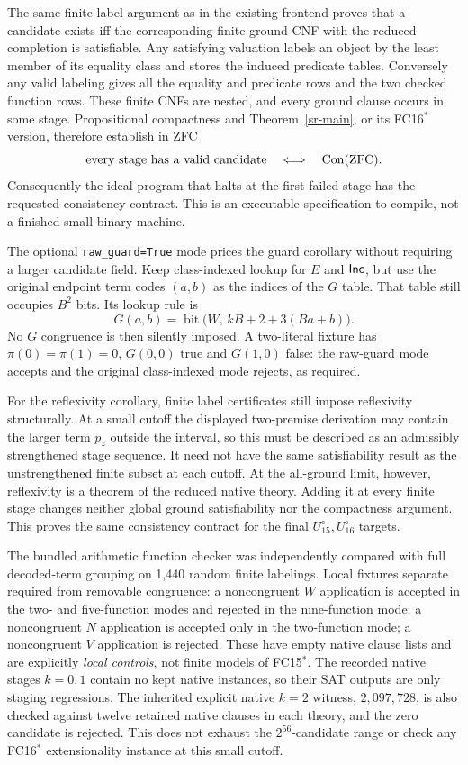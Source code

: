 The same finite-label argument as in the existing frontend proves that a
candidate exists iff the corresponding finite ground CNF with the reduced
completion is satisfiable. Any satisfying valuation labels an object by
the least member of its equality class and stores the induced predicate
tables. Conversely any valid labeling gives all the equality and predicate
rows and the two checked function rows. These finite CNFs are nested, and
every ground clause occurs in some stage. Propositional compactness and
Theorem~\ref{sr-main}, or its FC16$^*$ version, therefore establish in ZFC
\[
\text{every stage has a valid candidate}
\quad\Longleftrightarrow\quad\operatorname{Con}(\mathrm{ZFC}).
\]
Consequently the ideal program that halts at the first failed stage has
the requested consistency contract. This is an executable specification
to compile, not a finished small binary machine.

The optional \texttt{raw\_guard=True} mode prices the guard corollary
without requiring a larger candidate field. Keep class-indexed lookup for
$E$ and $\mathsf{Inc}$, but use the original endpoint term codes $(a,b)$ as the
indices of the $G$ table. That table still occupies $B^2$ bits. Its lookup
rule is
\[
G(a,b)=\operatorname{bit}\bigl(W,\,kB+2+3(Ba+b)\bigr).
\]
No $G$ congruence is then silently imposed. A two-literal fixture has
$\pi(0)=\pi(1)=0$, $G(0,0)$ true and $G(1,0)$ false: the raw-guard
mode accepts and the original class-indexed mode rejects, as required.

For the reflexivity corollary, finite label certificates still impose
reflexivity structurally. At a small cutoff the displayed two-premise
derivation may contain the larger term $p_z$ outside the interval, so
this must be described as an admissibly strengthened stage sequence.
It need not have the same satisfiability result as the unstrengthened
finite subset at each cutoff. At the all-ground limit, however,
reflexivity is a theorem of the reduced native theory. Adding it at every
finite stage changes neither global ground satisfiability nor the
compactness argument. This proves the same consistency contract for the
final $U_{15}^{\circ},U_{16}^{\circ}$ targets.

The bundled arithmetic function checker was independently compared with
full decoded-term grouping on 1,440 random finite labelings. Local fixtures
separate required from removable congruence: a noncongruent $W$ application
is accepted in the two- and five-function modes and rejected in the
nine-function mode; a noncongruent $N$ application is accepted only in the
two-function mode; a noncongruent $V$ application is rejected. These have
empty native clause lists and are explicitly \emph{local controls}, not
finite models of FC15$^*$. The recorded native stages $k=0,1$ contain no
kept native instances, so their SAT outputs are only staging regressions.
The inherited explicit native $k=2$ witness, $2{,}097{,}728$, is also
checked against twelve retained native clauses in each theory, and the
zero candidate is rejected. This does not exhaust the $2^{56}$-candidate
range or check any FC16$^*$ extensionality instance at this small cutoff.

